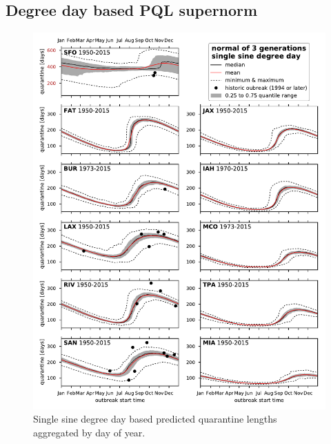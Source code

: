 \documentclass[10pt,a4paper]{article}
\begin{document}
\subsection{Degree day based PQL supernorm}
\begin{figure}[hb!]
\centering
\includegraphics{figs/fig_all_BMDD_supernorm.pdf}
\caption{\label{fig:ddPQL_supernorm}
Single sine degree day based predicted quarantine lengths aggregated by day of year.
}
\end{figure}
\clearpage
\end{document}
